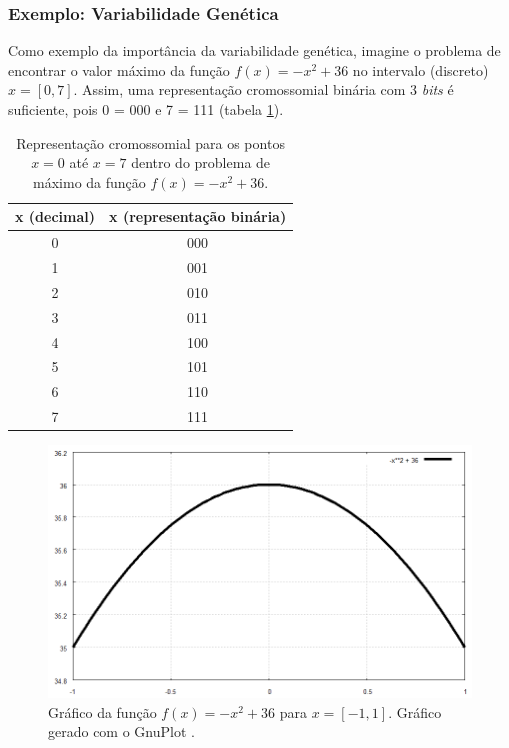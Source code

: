 	\subsubsection{\label{ExemploVariabilidade}Exemplo: Variabilidade Genética}
	
	Como exemplo da importância da variabilidade genética, imagine o problema de encontrar o valor máximo da função $f(x) = -x^2 + 36$ no intervalo (discreto) $x = [0,7]$. Assim, uma representação cromossomial binária com 3 \textit{bits} é suficiente, pois 0 = 000 e 7 = 111 (tabela \ref{tabRepCroX2}).
	
	\begin{table}[htp]
 		\caption{\label{tabRepCroX2}Representação cromossomial para os pontos $x = 0$ até $x = 7$ dentro do problema de máximo da função $f(x) = -x^2 + 36$.}
 		\begin{center}
  		\begin{tabular}{c|c}
   			\hline
   			\textbf{x (decimal)}  & \textbf{x (representação binária)} \\
   			\hline
   			0 & 000 \\
   			1 & 001 \\
   			2 & 010 \\ 
   			3 & 011 \\
   			4 & 100 \\
   			5 & 101 \\ 
   			6 & 110 \\
   			7 & 111	\\
   			\hline
   		\end{tabular}
 		\end{center}
	\end{table}
	
	\begin{figure}[htp]
		\begin{center}
			\includegraphics[width=13cm]{figs/ga/Parabola.png}
		\end{center}
		\caption{\label{figParabola}Gráfico da função $f(x) = -x^2 + 36$ para $x = [-1,1]$. Gráfico gerado com o GnuPlot \cite{gnuplot}.}
	\end{figure}
	
